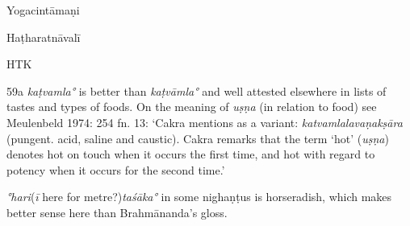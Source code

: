 \begin{ekdosis}
\begin{testimonia}[hp01_059]
Yogacintāmaṇi

\begin{versinnote}
\end{versinnote}

Haṭharatnāvalī

\begin{versinnote}
\end{versinnote}

HTK

\begin{versinnote}
\end{versinnote}

\end{testimonia}

\begin{philcomm}[hp01_059]
59a \emph{kaṭvamla°} is better than \emph{kaṭvāmla°} and well attested elsewhere in lists of tastes and types of foods.
On the meaning of \emph{uṣṇa} (in relation to food) see Meulenbeld 1974: 254 fn. 13: ‘Cakra mentions as a variant: \emph{katvamlalavaṇakṣāra} (pungent. acid, saline and caustic). Cakra remarks that the term `hot' (\emph{uṣṇa}) denotes hot on touch when it occurs the first time, and hot with regard to potency when it occurs for the second time.’

\emph{°hari}(\emph{ī} here for metre?)\emph{taśāka°} in some nighaṇṭus is horseradish, which makes better sense here than Brahmānanda’s gloss.


\end{philcomm}
\end{ekdosis}
